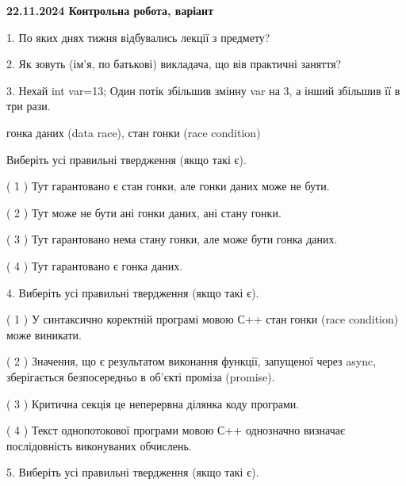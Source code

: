 \documentclass[12pt, ukrainian]{article}
\begin{document}
\vspace{4mm}
\newpage
\begin {large}

\textbf{22.11.2024 Контрольна робота, варіант  }\par


{
1. По яких днях тижня відбувались лекції з предмету?



\vspace{5mm}
2. Як зовуть (ім'я, по батькові) викладача, що вів практичні заняття?



\vspace{5mm}
3. Нехай int var=13; Один потік збільшив змінну var на 3, а інший збільшив її в три рази.

гонка даних (data race), стан гонки (race condition)

Виберіть усі правильні твердження (якщо такі є).\par
\vspace{2mm}
( 1 ) Тут гарантовано є стан гонки, але гонки даних може не бути.%

( 2 ) Тут може не бути ані гонки даних, ані стану гонки.%

( 3 ) Тут гарантовано нема стану гонки, але може бути гонка даних.%

( 4 ) Тут гарантовано є гонка даних.%


\vspace{5mm}
4. Виберіть усі правильні твердження (якщо такі є).\par
\vspace{2mm}

( 1 ) У синтаксично коректній програмі мовою С++ стан гонки (race condition) може виникати.%

( 2 ) Значення, що є результатом виконання функції, запущеної через async, зберігається безпосередньо в об’єкті проміза (promise).%

( 3 ) Критична секція це неперервна ділянка коду програми.%

( 4 ) Текст однопотокової програми мовою С++ однозначно визначає послідовність виконуваних обчислень.%


\vspace{5mm}
5. Виберіть усі правильні твердження (якщо такі є).\par
\vspace{2mm}

}
\end{large}
\end{document}
